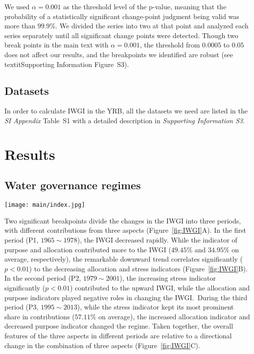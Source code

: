 \documentclass[draft]{../agujournal2019}
\begin{document}
We used $\alpha = 0.001$ as the threshold level of the p-value, meaning that the probability of a statistically significant change-point judgment being valid was more than $99.9\%$. We divided the series into two at that point and analyzed each series separately until all significant change points were detected. Though two break points in the main text with $\alpha = 0.001$, the threshold from $0.0005$ to $0.05$ does not affect our results, and the breakpoints we identified are robust (see \\textit{Supporting Information} Figure~S3).

	\subsection{Datasets}
In order to calculate IWGI in the YRB, all the datasets we need are listed in the \textit{SI Appendix} Table~S1 with a detailed description in \textit{Supporting Information S3}.
 \section{Results}\label{sec2}
\subsection{Water governance regimes}\label{Res.1}

\begin{figure*}[ht!]
	\centering
	\texttt{[image: main/index.jpg]}
	\caption{Changes in the IWGI index and corresponding water governance regimes: P1: $1965 \sim 1978$, P2: $1979 \sim 2001$, and P3: $2002 \sim 2013$.
	\textbf{A,} detecting change points of IWGI and contributions from each indicator. Two significant change points ($p<0.01$) occurred in 1978 and 2001.
	\textbf{B,} correlation of trends between the IWGI and the indicators.
	\textbf{C,} across three indicators, changing components of the IWGI, whose directions shifts between different regimes.
	}\label{fig:IWGI}
\end{figure*}

Two significant breakpoints divide the changes in the IWGI into three periods, with different contributions from three aspects (Figure~\ref{fig:IWGI}A).
In the first period (P1, $1965 \sim 1978$), the IWGI decreased rapidly.
While the indicator of purpose and allocation contributed more to the IWGI ($49.45\%$ and $34.95\%$ on average, respectively), the remarkable downward trend correlates significantly ($p<0.01$) to the decreasing allocation and stress indicators (Figure~\ref{fig:IWGI}B).
In the second period (P2, $1979 \sim 2001$), the increasing stress indicator significantly ($p<0.01$) contributed to the upward IWGI, while the allocation and purpose indicators played negative roles in changing the IWGI.\
During the third period (P3, $1995 \sim 2013$), while the stress indicator kept its most prominent share in contributions ($57.11\%$ on average), the increased allocation indicator and decreased purpose indicator changed the regime.
Taken together, the overall features of the three aspects in different periods are relative to a directional change in the combination of three aspects (Figure~\ref{fig:IWGI}C).
\end{document}
